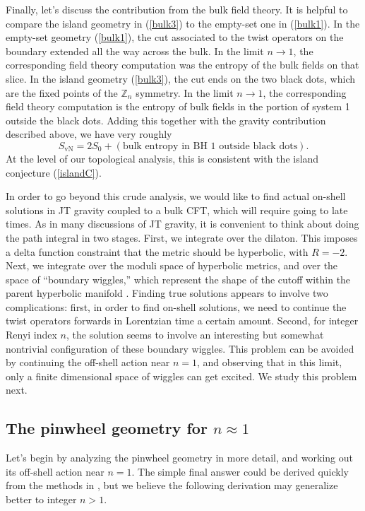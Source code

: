 \documentclass[11pt]{article}
\newcommand{\be}{\begin{equation}}
\newcommand{\ee}{\end{equation}}
\numberwithin{equation}{section}
\begin{document}
Finally, let's discuss the contribution from the bulk field theory. It is helpful to compare the island geometry in (\ref{bulk3}) to the empty-set one in (\ref{bulk1}). In the empty-set geometry (\ref{bulk1}), the cut associated to the twist operators on the boundary extended all the way across the bulk. In the limit $n\rightarrow 1$, the corresponding field theory computation was the entropy of the bulk fields on that slice. In the island geometry (\ref{bulk3}), the cut ends on the two black dots, which are the fixed points of the $\mathbb{Z}_n$ symmetry. In the limit $n\rightarrow 1$, the corresponding field theory computation is the entropy of bulk fields in the portion of system 1 outside the black dots. Adding this together with the gravity contribution described above, we have very roughly
\be
S_{\text{vN}} =  2S_0 + (\text{bulk entropy in BH 1 outside black dots}).
\ee
At the level of our topological analysis, this is consistent with the island conjecture (\ref{islandC}).

In order to go beyond this crude analysis, we would like to find actual on-shell solutions in JT gravity coupled to a bulk CFT, which will require going to late times. As in many discussions of JT gravity, it is convenient to think about doing the path integral in two stages. First, we integrate over the dilaton. This imposes a delta function constraint that the metric should be hyperbolic, with $R = -2$. Next, we integrate over the moduli space of hyperbolic metrics, and over the space of ``boundary wiggles,'' which represent the shape of the cutoff within the parent hyperbolic manifold \cite{Maldacena:2019cbz}. Finding true solutions appears to involve two complications: first, in order to find on-shell solutions, we need to continue the twist operators forwards in Lorentzian time a certain amount. Second, for integer Renyi index $n$, the solution seems to involve an interesting but somewhat nontrivial configuration of these boundary wiggles. This problem can be avoided by continuing the off-shell action near $n = 1$, and observing that in this limit, only a finite dimensional space of wiggles can get excited. We study this problem next.

\subsection{The pinwheel geometry for \texorpdfstring{$n \approx 1$}{n near 1}}
Let's begin by analyzing the pinwheel geometry in more detail, and working out its off-shell action near $n = 1$. The simple final answer could be derived quickly from the methods in \cite{Lewkowycz:2013nqa,Dong:2017xht}, but we believe the following derivation may generalize better to integer $n >1$.
\end{document}
